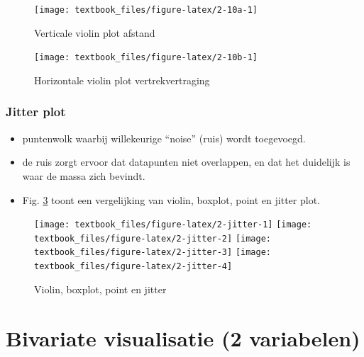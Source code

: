 \documentclass[]{tufte-book}
\providecommand{\tightlist}{%
  \setlength{\itemsep}{0pt}\setlength{\parskip}{0pt}}
\begin{document}
\begin{figure}

{\centering \texttt{[image: textbook\_files/figure-latex/2-10a-1]} 

}

\caption[Verticale violin plot afstand]{Verticale violin plot afstand}\label{fig:2-10a}
\end{figure}

\begin{figure}
\texttt{[image: textbook\_files/figure-latex/2-10b-1]} \caption[Horizontale violin plot vertrekvertraging]{Horizontale violin plot vertrekvertraging}\label{fig:2-10b}
\end{figure}

\hypertarget{jitter-plot}{%
\subsubsection{Jitter plot}\label{jitter-plot}}

\begin{itemize}
\tightlist
\item
  puntenwolk waarbij willekeurige ``noise'' (ruis) wordt toegevoegd.
\item
  de ruis zorgt ervoor dat datapunten niet overlappen, en dat het duidelijk is waar de massa zich bevindt.
\item
  Fig. \ref{fig:2-jitter} toont een vergelijking van violin, boxplot, point en jitter plot.
\end{itemize}

\begin{figure}
\texttt{[image: textbook\_files/figure-latex/2-jitter-1]} \texttt{[image: textbook\_files/figure-latex/2-jitter-2]} \texttt{[image: textbook\_files/figure-latex/2-jitter-3]} \texttt{[image: textbook\_files/figure-latex/2-jitter-4]} \caption[Violin, boxplot, point en jitter]{Violin, boxplot, point en jitter}\label{fig:2-jitter}
\end{figure}

\hypertarget{bivariate-visualisatie-2-variabelen}{%
\section{Bivariate visualisatie (2 variabelen)}\label{bivariate-visualisatie-2-variabelen}}
\end{document}
